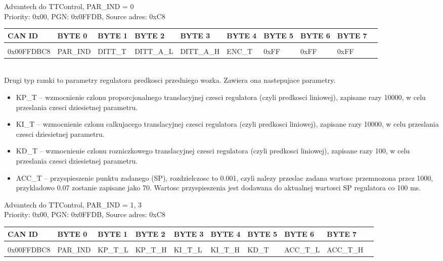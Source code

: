 \documentclass{article}
\begin{document}
Advantech do TTControl, PAR\_IND = 0\\
Priority: 0x00, PGN: 0x0FFDB, Source adres: 0xC8 \\
\begin{left}
\begin{tabular}{ |p{2cm}|p{1.35cm}|p{1.2cm}|p{1.50cm}|p{1.50cm}|p{1.35cm}|p{1.35cm}|p{1.35cm}|p{1.35cm}|p{1.35cm}|} 
 \hline
 CAN ID & BYTE 0 & BYTE 1 & BYTE 2 & BYTE 3 & BYTE 4 & BYTE 5 & BYTE 6 & BYTE 7 \\ \hline
 & & & & & & & &\\
0x00FFDBC8 & PAR\_IND & DITT\_T & DITT\_A\_L & DITT\_A\_H  & ENC\_T & 0xFF & 0xFF & 0xFF\\
 \hline
\end{tabular}
\end{left}\\

Drugi typ ramki to parametry regulatora predkosci przedniego wozka. Zawiera ona nastepujace parametry. 
\begin{itemize}
    \item KP\_T -- wzmocnienie czlonu proporcjonalnego translacyjnej czesci regulatora (czyli predkosci liniowej), zapisane razy 10000, w celu przeslania czesci dziesietnej parametru.
    \item KI\_T -- wzmocnienie czlonu calkujacego translacyjnej czesci regulatora (czyli predkosci liniowej), zapisane razy 10000, w celu przeslania czesci dziesietnej parametru.
    \item KD\_T -- wzmocnienie czlonu rozniczkowego translacyjnej czesci regulatora (czyli predkosci liniowej), zapisane razy 100, w celu przeslania czesci dziesietnej parametru.
    \item ACC\_T -- przyspieszenie punktu zadanego (SP), rozdzielczosc to 0.001, czyli nalezy przeslac zadana wartosc przemnozona przez 1000, przykladowo 0.07 zostanie zapisane jako 70. Wartosc przyspieszenia jest dodawana do aktualnej wartosci SP regulatora co 100 ms.
\end{itemize}

Advantech do TTControl, PAR\_IND  = 1, 3\\
Priority: 0x00, PGN: 0x0FFDB, Source adres: 0xC8 \\
\begin{left}
\begin{tabular}{ |p{2cm}|p{1.35cm}|p{1.2cm}|p{1.50cm}|p{1.50cm}|p{1.35cm}|p{1.4cm}|p{1.4cm}|p{1.35cm}|p{1.6cm}|} 
 \hline
 CAN ID & BYTE 0 & BYTE 1 & BYTE 2 & BYTE 3 & BYTE 4 & BYTE 5 & BYTE 6 & BYTE 7 \\ \hline
 & & & & & & & &\\
0x00FFDBC8 & PAR\_IND & KP\_T\_L & KP\_T\_H & KI\_T\_L & KI\_T\_H & KD\_T & ACC\_T\_L & ACC\_T\_H  \\
 \hline
\end{tabular}
\end{left}\\
\end{document}
